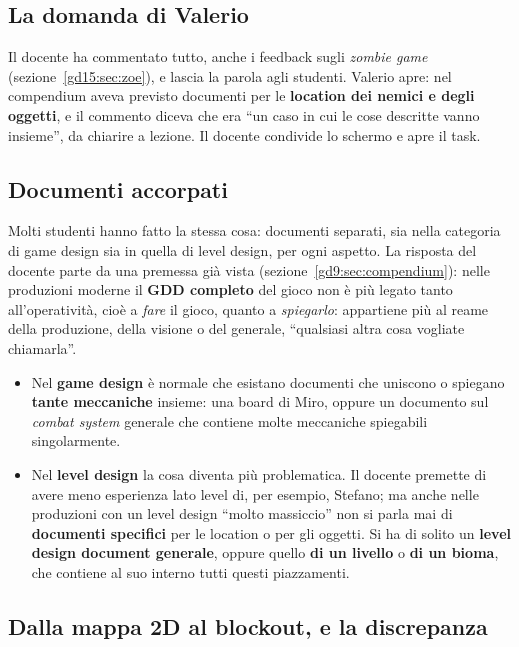 \subsection{La domanda di Valerio}

Il docente ha commentato tutto, anche i feedback sugli \emph{zombie game}
(sezione~\ref{gd15:sec:zoe}), e lascia la parola agli studenti. Valerio
apre: nel compendium aveva previsto documenti per le \textbf{location dei
nemici e degli oggetti}, e il commento diceva che era ``un caso in cui le
cose descritte vanno insieme'', da chiarire a lezione. Il docente condivide
lo schermo e apre il task.

\subsection{Documenti accorpati}

Molti studenti hanno fatto la stessa cosa: documenti separati, sia nella
categoria di game design sia in quella di level design, per ogni aspetto.
La risposta del docente parte da una premessa già vista
(sezione~\ref{gd9:sec:compendium}): nelle produzioni moderne il \textbf{GDD
completo} del gioco non è più legato tanto all'operatività, cioè a
\emph{fare} il gioco, quanto a \emph{spiegarlo}: appartiene più al reame
della produzione, della visione o del generale, ``qualsiasi altra cosa
vogliate chiamarla''.
\begin{itemize}
  \item Nel \textbf{game design} è normale che esistano documenti che
        uniscono o spiegano \textbf{tante meccaniche} insieme: una board di
        Miro, oppure un documento sul \emph{combat system} generale che
        contiene molte meccaniche spiegabili singolarmente.
  \item Nel \textbf{level design} la cosa diventa più problematica. Il
        docente premette di avere meno esperienza lato level di, per
        esempio, Stefano; ma anche nelle produzioni con un level design
        ``molto massiccio'' non si parla mai di \textbf{documenti specifici}
        per le location o per gli oggetti. Si ha di solito un \textbf{level
        design document generale}, oppure quello \textbf{di un livello} o
        \textbf{di un bioma}, che contiene al suo interno tutti questi
        piazzamenti.
\end{itemize}

\subsection{Dalla mappa 2D al blockout, e la discrepanza}

